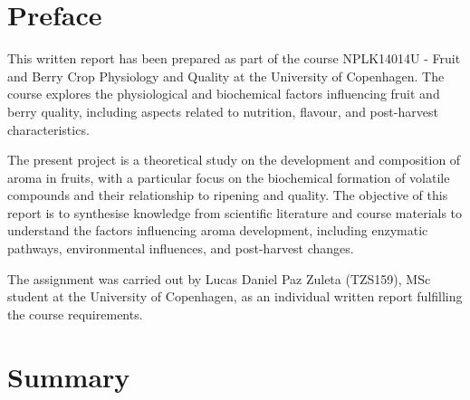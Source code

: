 \setlength{\headheight}{12.71342pt}
\addtolength{\topmargin}{-0.71342pt}


\section*{Preface}
This written report has been prepared as part of the course NPLK14014U - Fruit and Berry Crop Physiology and Quality at the University of Copenhagen. The course explores the physiological and biochemical factors influencing fruit and berry quality, including aspects related to nutrition, flavour, and post-harvest characteristics.

\vspace{1em}
The present project is a theoretical study on the development and composition of aroma in fruits, with a particular focus on the biochemical formation of volatile compounds and their relationship to ripening and quality. The objective of this report is to synthesise knowledge from scientific literature and course materials to understand the factors influencing aroma development, including enzymatic pathways, environmental influences, and post-harvest changes.

\vspace{1em}
The assignment was carried out by Lucas Daniel Paz Zuleta (TZS159), MSc student at the University of Copenhagen, as an individual written report fulfilling the course requirements.

\section*{Summary}


